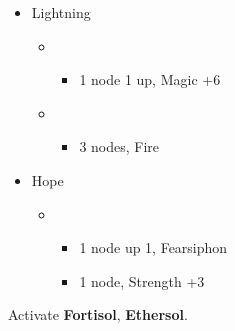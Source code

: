 \begin{menu}
	\begin{itemize}
		\crystarium
		\begin{itemize}
			\item Lightning
			      \begin{itemize}
				      \item \com
				            \begin{itemize}
					            \item 1 node 1 up, Magic +6
				            \end{itemize}
				      \item \rav
				            \begin{itemize}
					            \item 3 nodes, Fire
				            \end{itemize}
			      \end{itemize}
			\item Hope
			      \begin{itemize}
				      \item \rav
				            \begin{itemize}
					            \item 1 node up 1, Fearsiphon
					            \item 1 node, Strength +3
				            \end{itemize}
			      \end{itemize}
		\end{itemize}
	\end{itemize}
\end{menu}
Activate \textbf{Fortisol}, \textbf{Ethersol}.
\vfill

